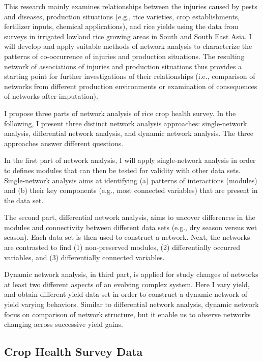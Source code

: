 

This research mainly examines relationships between the injuries caused by pests and diseases, production situations (e.g., rice varieties, crop establishments, fertilizer inputs, chemical applications), and rice yields using the data from surveys in irrigated lowland rice growing areas in South and South East Asia. I will develop and apply suitable methods of network analysis to characterize the patterns of co-occurrence of injuries and production situations. The resulting network of associations of injuries and production situations thus provides a starting point for further investigations of their relationships (i.e., comparison of networks from different production environments or examination of consequences of networks after imputation).

I propose three parts of network analysis of rice crop health survey. In the following, I present three distinct network analysis approaches: single-network analysis, differential network analysis, and dynamic network analysis. The three approaches answer different questions. 

In the first part of network analysis, I will apply single-network analysis in order to defines modules that can then be tested for validity with other data sets. Single-network analysis aims at identifying (a) patterns of interactions (modules) and (b) their key components (e.g., most connected variables) that are present in the data set.

The second part, differential network analysis, aims to uncover differences in the modules and connectivity between different data sets (e.g., dry season versus wet season). Each data set is then used to construct a network. Next, the networks are contrasted to find (1) non-preserved modules, (2) differentially occurred variables, and (3) differentially connected variables. 

Dynamic network analysis, in third part, is applied for study changes of networks at least two different aspects of an evolving complex system. Here I vary yield, and obtain different yield data set in order to construct a dynamic network of yield varying behaviors.  Similar to differential network analysis, dynamic network focus on comparison of network structure, but it enable us to observe networks changing across successive yield gains. 


\subsection*{Crop Health Survey Data}

